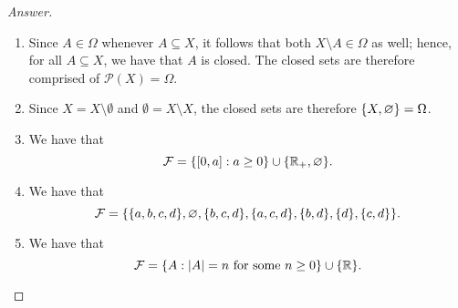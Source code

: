 \begin{proof}[Answer]
    \begin{enumerate}
        \item Since $A \in \Omega$ whenever $A \subseteq X$, it follows that
            both $X \setminus A \in \Omega$ as well; hence, for all $A \subseteq
            X$, we have that $A$ is closed. The closed sets are therefore
            comprised of $\mathcal{P}(X) = \Omega$.
        \item Since $X = X \setminus \emptyset$ and $\emptyset = X \setminus X$,
            the closed sets are therefore $\{X, \varnothing\} = \Omega$.
        \item We have that
            \[
                \mathcal{F} = \{[0, a] : a \geq 0\} \cup \{\mathbb{R}_+,\varnothing\}.
            \]
        \item We have that
            \[
                \mathcal{F} = \{
                    \{a,b,c,d\}, \varnothing, \{b,c,d\}, \{a,c,d\},
                    \{b,d\}, \{d\}, \{c, d\}
                \}.
            \]
        \item We have that 
            \[
                \mathcal{F} = \{A : |A| = n \text{ for some } n \geq 0\}
                \cup \{\mathbb{R}\}. \qedhere
            \]
    \end{enumerate}
\end{proof}


